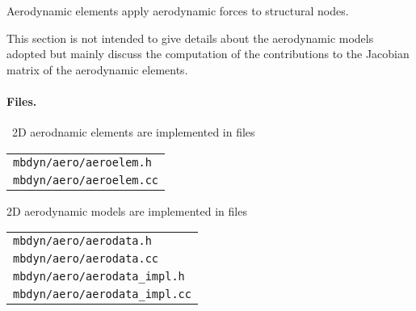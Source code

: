 %
%
%
%
%
% 
%
%
%

Aerodynamic elements apply aerodynamic forces to structural nodes.

This section is not intended 
to give details about the aerodynamic models adopted but mainly 
discuss the computation of the contributions to the Jacobian 
matrix of the aerodynamic elements.

\paragraph{Files.} \
2D aerodnamic elements are implemented in files \\
\begin{tabular}{l}
\texttt{mbdyn/aero/aeroelem.h} \\
\texttt{mbdyn/aero/aeroelem.cc} 
\end{tabular}

2D aerodynamic models are implemented in files \\
\begin{tabular}{l}
\texttt{mbdyn/aero/aerodata.h} \\
\texttt{mbdyn/aero/aerodata.cc} \\
\texttt{mbdyn/aero/aerodata\_impl.h} \\
\texttt{mbdyn/aero/aerodata\_impl.cc} 
\end{tabular}

